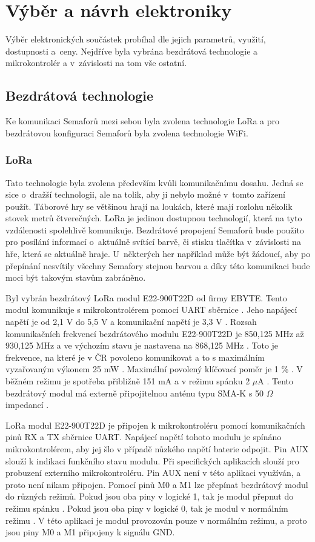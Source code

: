 \chapter{Výběr a návrh elektroniky}
Výběr elektronických součástek probíhal dle jejich parametrů, využití, dostupnosti a~ceny. Nejdříve byla vybrána bezdrátová technologie a mikrokontrolér a v~závislosti 
na tom vše ostatní. 

\section{Bezdrátová technologie}
Ke komunikaci Semaforů mezi sebou byla zvolena technologie LoRa a pro bezdrátovou konfiguraci Semaforů byla zvolena technologie WiFi. 

\subsection{LoRa}
 Tato technologie byla zvolena především kvůli komunikačnímu dosahu. Jedná se sice o~dražší technologii, 
ale na tolik, aby ji nebylo možné v~tomto zařízení použít. Táborové hry se většinou hrají na loukách, které mají rozlohu několik stovek metrů čtverečných. LoRa je jedinou
dostupnou technologií, která na tyto vzdálenosti spolehlivě komunikuje. Bezdrátové propojení Semaforů bude použito pro posílání informací o~aktuálně svítící barvě, či 
stisku tlačítka v~závislosti na hře, která se aktuálně hraje. U~některých her například může být žádoucí, aby po přepínání nesvítily všechny Semafory stejnou barvou 
a díky této komunikaci bude moci být takovým stavům zabráněno. 

Byl vybrán bezdrátový LoRa modul E22-900T22D od firmy EBYTE. Tento modul komunikuje s mikrokontrolérem pomocí UART sběrnice \cite{LoRa_ebyte}. Jeho napájecí napětí je od 
2,1 V do 5,5 V a komunikační napětí je 3,3 V \cite{LoRa_ebyte}. Rozsah komunikačních frekvencí bezdrátového modulu E22-900T22D je 850,125 MHz až 930,125 MHz a ve výchozím 
stavu je nastavena na 868,125 MHz \cite{LoRa_ebyte}. Toto je frekvence, na které je v ČR povoleno komunikovat a to s maximálním vyzařovaným výkonem 25 mW \cite{CTU}. 
Maximální povolený klíčovací poměr je 1 \% \cite{CTU}. %
V běžném režimu je spotřeba přibližně 151 mA a v režimu spánku 2 $\mu$A \cite{LoRa_ebyte}. Tento bezdrátový modul má externě připojitelnou anténu typu SMA-K s 50 $\Omega$ 
impedancí \cite{LoRa_ebyte}.

LoRa modul E22-900T22D je připojen k mikrokontroléru pomocí komunikačních pinů RX a TX sběrnice UART. Napájecí napětí tohoto modulu je spínáno mikrokontrolérem, aby jej 
šlo v případě nůzkého napětí baterie odpojit. Pin AUX slouží k indikaci funkčního stavu modulu. Při specifických aplikacích slouží pro probuzení externího mikrokontroléru. 
Pin AUX není v této aplikaci využíván, a proto není nikam připojen. Pomocí pinů M0 a M1 lze přepínat bezdrátový modul do různých režimů. Pokud jsou oba piny v logické 1, 
tak je modul přepnut do režimu spánku \cite{LoRa_ebyte}. Pokud jsou oba piny v logické 0, tak je modul v normálním režimu \cite{LoRa_ebyte}. V této aplikaci je modul 
provozován pouze v normálním režimu, a proto jsou piny M0 a M1 připojeny k signálu GND. 

